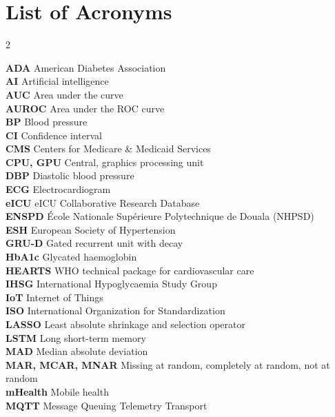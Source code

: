 \cleardoublepage
{}
\tableofcontents

\chapter*{List of Acronyms}
{\small
\begin{multicols}{2}\raggedright
\textbf{ADA} American Diabetes Association\\
\textbf{AI} Artificial intelligence\\
\textbf{AUC} Area under the curve\\
\textbf{AUROC} Area under the ROC curve\\
\textbf{BP} Blood pressure\\
\textbf{CI} Confidence interval\\
\textbf{CMS} Centers for Medicare \& Medicaid Services\\
\textbf{CPU, GPU} Central, graphics processing unit\\
\textbf{DBP} Diastolic blood pressure\\
\textbf{ECG} Electrocardiogram\\
\textbf{eICU} eICU Collaborative Research Database\\
\textbf{ENSPD} \'Ecole Nationale Sup\'erieure Polytechnique de Douala (NHPSD)\\
\textbf{ESH} European Society of Hypertension\\
\textbf{GRU-D} Gated recurrent unit with decay\\
\textbf{HbA1c} Glycated haemoglobin\\
\textbf{HEARTS} WHO technical package for cardiovascular care\\
\textbf{IHSG} International Hypoglycaemia Study Group\\
\textbf{IoT} Internet of Things\\
\textbf{ISO} International Organization for Standardization\\
\textbf{LASSO} Least absolute shrinkage and selection operator\\
\textbf{LSTM} Long short-term memory\\
\textbf{MAD} Median absolute deviation\\
\textbf{MAR, MCAR, MNAR} Missing at random, completely at random, not at random\\
\textbf{mHealth} Mobile health\\
\textbf{MQTT} Message Queuing Telemetry Transport\\

\end{multicols}}

